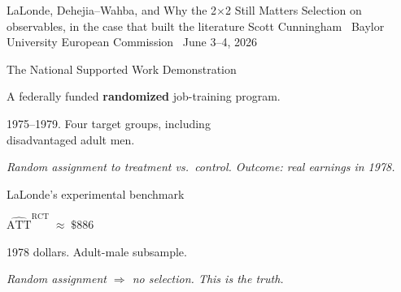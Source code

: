 \documentclass[11pt,aspectratio=169]{beamer}
\begin{document}
\codechellatitle
  {LaLonde, Dehejia--Wahba, and Why the 2$\times$2 Still Matters}
  {Selection on observables, in the case that built the literature}
  {Scott Cunningham \textperiodcentered\ Baylor University}
  {European Commission \textperiodcentered\ June 3--4, 2026}


\begin{frame}{The National Supported Work Demonstration}
\vspace{1em}
\begin{center}
\large
A federally funded \textbf{randomized} job-training program.
\end{center}
\vspace{0.4em}
\begin{center}
\large
1975--1979. Four target groups, including \\[0.2em] disadvantaged adult men.
\end{center}
\vspace{0.6em}
\begin{center}
\small\color{warmgray}\itshape
Random assignment to treatment vs.\ control. \;Outcome: real earnings in 1978.
\end{center}
\end{frame}

\begin{frame}{LaLonde's experimental benchmark}
\vspace{1.6em}
\begin{center}
\Large
$\widehat{\text{ATT}}^{\text{RCT}} \;\approx\; \$886$
\end{center}
\vspace{0.6em}
\begin{center}
1978 dollars. \;Adult-male subsample.
\end{center}
\vspace{1em}
\begin{center}
\small\color{warmgray}\itshape
Random assignment $\Rightarrow$ no selection. \;This is the \textit{truth}.
\end{center}
\end{frame}
\end{document}
